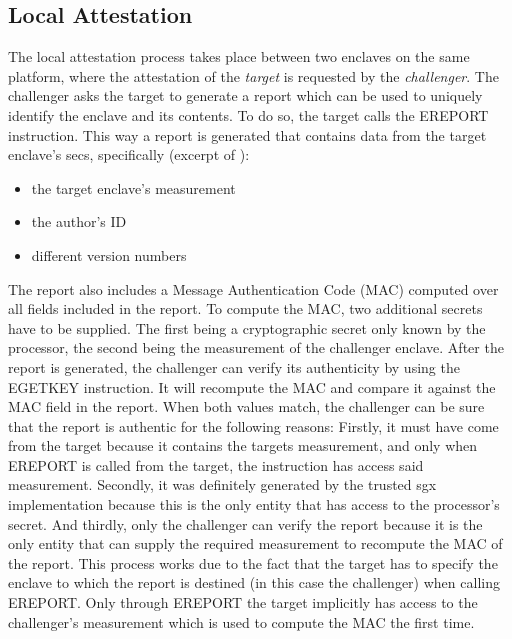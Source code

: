 \subsection{Local Attestation}
The local attestation process takes place between two enclaves on the same platform, where the attestation of the \textit{target} is requested by the \textit{challenger}. The 
challenger asks the target to generate a report which can be used to uniquely identify the enclave and its contents. To do so, the target calls the EREPORT instruction. This way
a report is generated that contains data from the target enclave's \ac{secs}, specifically (excerpt of \cite{EnclaveWritersGuide}):
\begin{itemize}
    \item the target enclave's measurement
    \item the author's ID
    \item different version numbers
\end{itemize}
The report also includes a Message Authentication Code (MAC) computed over all fields included in the report. To compute the MAC, two additional secrets have to be supplied.
The first being a cryptographic secret only known by the processor, the second being the measurement of the challenger enclave. After the report is generated, the challenger can
verify its authenticity by using the EGETKEY instruction. It will recompute the MAC and compare it against the MAC field in the report. When both values match, the challenger can
be sure that the report is authentic for the following reasons: Firstly, it must have come from the target because it contains the targets measurement, and only when EREPORT is 
called from the target, the instruction has access said measurement. Secondly, it was definitely generated by the trusted \ac{sgx} implementation because this is the only entity that 
has access to the processor's secret. And thirdly, only the challenger can verify the report because it is the only entity that can supply the required measurement to recompute the 
MAC of the report. This process works due to the fact that the target has to specify the enclave to which the report is destined (in this case the challenger) when calling EREPORT.
Only through EREPORT the target implicitly has access to the challenger's measurement which is used to compute the MAC the first time.

